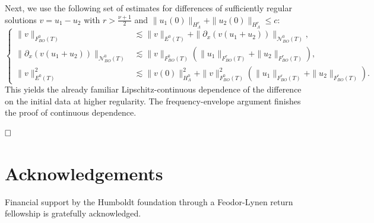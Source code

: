 \documentclass{amsart}
\theoremstyle{definition}
\begin{document}
Next, we use the following set of estimates for differences of sufficiently regular solutions $v = u_1-u_2$ with $r > \frac{\nu+1}{2}$ and $\| u_1(0) \|_{H^r_{\Lambda}} + \| u_2(0) \|_{H^r_{\Lambda}} \leq c$:
\begin{equation*}
\left\{ \begin{array}{cl}
\| v \|_{F_{BO}^{0}(T)} &\lesssim \| v \|_{E^{0}(T)} + \| \partial_x(v(u_1+u_2)) \|_{\mathcal{N}_{BO}^{0}(T)}, \\
\| \partial_x(v(u_1+u_2)) \|_{\mathcal{N}_{BO}^{0}(T)} &\lesssim \| v \|_{F_{BO}^{0}(T)} (\| u_1 \|_{F_{BO}^{r}(T)} + \| u_2 \|_{F^r_{BO}(T)}), \\
\| v \|^2_{E^{0}(T)} &\lesssim \| v(0) \|_{H^{0}_{\Lambda}}^2 + \| v \|_{F_{BO}^{0}(T)}^2 ( \| u_1 \|_{F_{BO}^r(T)} + \| u_2 \|_{F_{BO}^r(T)}).
\end{array} \right.
\end{equation*}
This yields the already familiar Lipschitz-continuous dependence of the difference on the initial data at higher regularity. The frequency-envelope argument finishes the proof of continuous dependence.

$\hfill \Box$

\section*{Acknowledgements}

Financial support by the Humboldt foundation through a Feodor-Lynen return fellowship is gratefully acknowledged.
\end{document}
